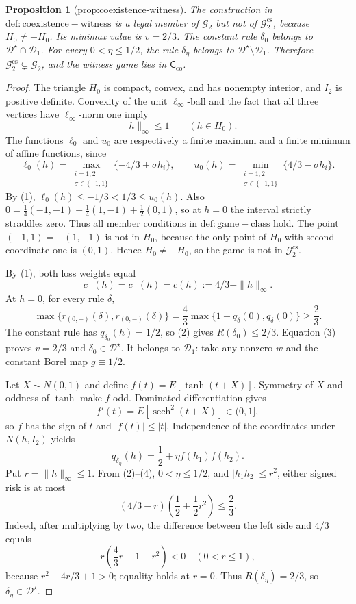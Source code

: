 \documentclass{article}
\newtheorem{proposition}{Proposition}
\begin{document}
\begin{proposition}[prop:coexistence-witness]\label{prop:coexistence-witness}
The construction in \(\mathrm{def:coexistence-witness}\) is a legal member of \(\mathcal G_2\) but not of \(\mathcal G_2^{\mathrm{cs}}\), because \(H_0\ne-H_0\). Its minimax value is \(v=2/3\). The constant rule \(\delta_0\) belongs to \(\mathcal D^{\star}\cap\mathcal D_1\). For every \(0<\eta\le1/2\), the rule \(\delta_{\eta}\) belongs to \(\mathcal D^{\star}\setminus\mathcal D_1\). Therefore \(\mathcal G_2^{\mathrm{cs}}\subsetneq\mathcal G_2\), and the witness game lies in \(\mathsf C_{\mathrm{co}}\).
\end{proposition}
\begin{proof}
The triangle \(H_0\) is compact, convex, and has nonempty interior, and \(I_2\) is positive definite. Convexity of the unit \(\ell_{\infty}\)-ball and the fact that all three vertices have \(\ell_{\infty}\)-norm one imply
\[
 \|h\|_{\infty}\leq1\qquad(h\in H_0). \tag{1}
\]
The functions \(\ell_0\) and \(u_0\) are respectively a finite maximum and a finite minimum of affine functions, since
\[
 \ell_0(h)=\max_{\substack{i=1,2\\ \sigma\in\{-1,1\}}}\{-4/3+\sigma h_i\},
 \qquad
 u_0(h)=\min_{\substack{i=1,2\\ \sigma\in\{-1,1\}}}\{4/3-\sigma h_i\}.
\]
By (1), \(\ell_0(h)\leq-1/3<1/3\leq u_0(h)\). Also
\(0=\tfrac14(-1,-1)+\tfrac14(1,-1)+\tfrac12(0,1)\), so at \(h=0\) the interval strictly straddles zero. Thus all member conditions in \(\mathrm{def:game-class}\) hold. The point \((-1,1)=-(1,-1)\) is not in \(H_0\), because the only point of \(H_0\) with second coordinate one is \((0,1)\). Hence \(H_0\neq-H_0\), so the game is not in \(\mathcal G_2^{\mathrm{cs}}\).

By (1), both loss weights equal
\[
 c_{+}(h)=c_{-}(h)=c(h):=4/3-\|h\|_{\infty}. \tag{2}
\]
At \(h=0\), for every rule \(\delta\),
\[
 \max\{r_{(0,+)}(\delta),r_{(0,-)}(\delta)\}
 =\frac43\max\{1-q_{\delta}(0),q_{\delta}(0)\}\geq\frac23. \tag{3}
\]
The constant rule has \(q_{\delta_0}(h)=1/2\), so (2) gives \(R(\delta_0)\leq2/3\). Equation (3) proves \(v=2/3\) and \(\delta_0\in\mathcal D^{\star}\). It belongs to \(\mathcal D_1\): take any nonzero \(w\) and the constant Borel map \(g\equiv1/2\).

Let \(X\sim N(0,1)\) and define \(f(t)=E[\tanh(t+X)]\). Symmetry of \(X\) and oddness of \(\tanh\) make \(f\) odd. Dominated differentiation gives
\[
 f'(t)=E[\operatorname{sech}^2(t+X)]\in(0,1],
\]
so \(f\) has the sign of \(t\) and \(|f(t)|\leq|t|\). Independence of the coordinates under \(N(h,I_2)\) yields
\[
 q_{\delta_{\eta}}(h)=\frac12+\eta f(h_1)f(h_2). \tag{4}
\]
Put \(r=\|h\|_{\infty}\leq1\). From (2)--(4), \(0<\eta\leq1/2\), and \(|h_1h_2|\leq r^2\), either signed risk is at most
\[
 (4/3-r)\left(\frac12+\frac12r^2\right)\leq\frac23. \tag{5}
\]
Indeed, after multiplying by two, the difference between the left side and \(4/3\) equals
\[
 r\left(\frac43r-1-r^2\right)<0\quad(0<r\leq1),
\]
because \(r^2-4r/3+1>0\); equality holds at \(r=0\). Thus \(R(\delta_{\eta})=2/3\), so \(\delta_{\eta}\in\mathcal D^{\star}\).


\end{proof}
\end{document}
